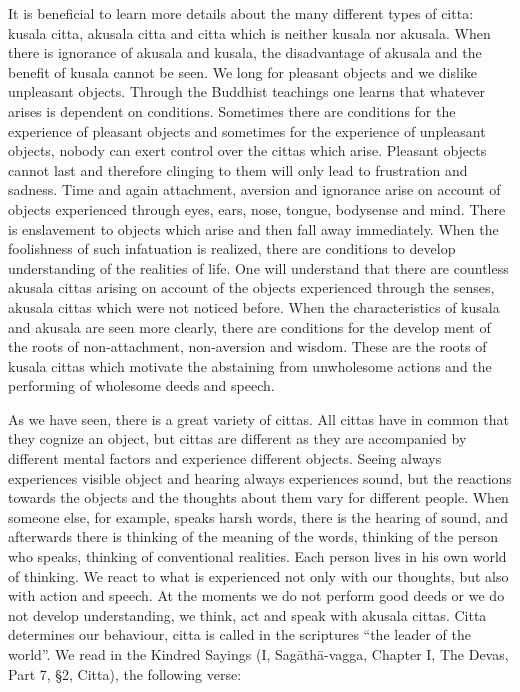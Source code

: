 \documentclass{book}
\begin{document}
It is beneficial to learn more details about the many different types of
citta: kusala citta, akusala citta and citta which is neither kusala nor
akusala. When there is ignorance of akusala and kusala, the disadvantage
of akusala and the benefit of kusala cannot be seen. We long for
pleasant objects and we dislike unpleasant objects. Through the Buddhist
teachings one learns that whatever arises is dependent on conditions.
Sometimes there are conditions for the experience of pleasant objects
and sometimes for the experience of unpleasant objects, nobody can exert
control over the cittas which arise. Pleasant objects cannot last and
therefore clinging to them will only lead to frustration and sadness.
Time and again attachment, aversion and ignorance arise on account of objects experienced through eyes, ears, nose, tongue, bodysense and    mind. There is enslavement to objects which arise and then fall away immediately. When the foolishness of such infatuation is realized,     there are conditions to develop understanding of the realities of life.  One will understand that there are countless akusala cittas arising on account of the objects experienced through the senses, akusala cittas  which were not noticed before. When the characteristics of kusala and akusala are seen more clearly, there are conditions for the develop­   ment of the roots of non-attachment, non-aversion and wisdom. These      are the roots of kusala cittas which moti­vate the abstaining from unwholesome actions and the performing of wholesome deeds and speech.

As we have seen, there is a great variety of cittas. All cittas have in
common that they cognize an object, but cittas are different as they are
accompanied by different mental factors and experience different
objects. Seeing always experiences visible object and hearing always
experiences sound, but the reactions towards the objects and the
thoughts about them vary for different people. When someone else, for
example, speaks harsh words, there is the hearing of sound, and
afterwards there is thinking of the meaning of the words, thinking of
the person who speaks, thinking of conventional realities. Each person
lives in his own world of thinking. We react to what is experienced not
only with our thoughts, but also with action and speech. At the moments
we do not perform good deeds or we do not develop understanding, we
think, act and speak with akusala cittas. Citta determines our
behaviour, citta is called in the scriptures ``the leader of the
world''. We read in the Kindred Sayings (I, Sagāthā-vagga, Chapter I,
The Devas, Part 7, §2, Citta), the following verse:
\end{document}
